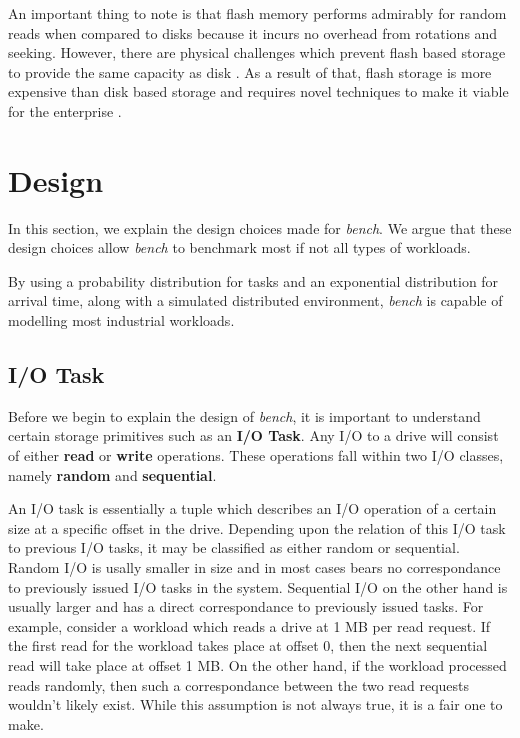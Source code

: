 \documentclass[10pt, author, twocolumn]{article}
\begin{document}
An important thing to note is that flash memory performs admirably for random reads when compared to disks because it incurs no overhead from rotations and seeking. However, there are physical challenges which prevent flash based storage to provide the same capacity as disk \cite{}. As a result of that, flash storage is more expensive than disk based storage and requires novel techniques to make it viable for the enterprise \cite{}. 

\section{Design}
In this section, we explain the design choices made for \textit{bench}. We argue that these design choices allow \textit{bench} to benchmark most if not all types of workloads. 

By using a probability distribution for tasks and an exponential distribution for arrival time, along with a simulated distributed environment, \textit{bench} is capable of modelling most industrial workloads. 

\subsection{I/O Task}
Before we begin to explain the design of \textit{bench}, it is important to understand certain storage primitives such as an \textbf{I/O Task}. Any I/O to a drive will consist of either \textbf{read} or \textbf{write} operations. These operations fall within two I/O classes, namely \textbf{random} and \textbf{sequential}. 

An I/O task is essentially a tuple which describes an I/O operation of a certain size at a specific offset in the drive. Depending upon the relation of this I/O task to previous I/O tasks, it may be classified as either random or sequential. Random I/O is usally smaller in size and in most cases bears no correspondance to previously issued I/O tasks in the system. Sequential I/O on the other hand is usually larger and has a direct correspondance to previously issued tasks. For example, consider a workload which reads a drive at 1 MB per read request. If the first read for the workload takes place at offset 0, then the next sequential read will take place at offset 1 MB. On the other hand, if the workload processed reads randomly, then such a correspondance between the two read requests wouldn't likely exist. While this assumption is not always true, it is a fair one to make.
\end{document}
